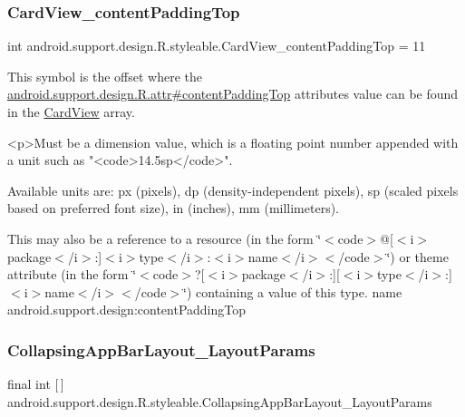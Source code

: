 \subsubsection{\texorpdfstring{Card\+View\+\_\+content\+Padding\+Top}{CardView\_contentPaddingTop}}
{\footnotesize\ttfamily int android.\+support.\+design.\+R.\+styleable.\+Card\+View\+\_\+content\+Padding\+Top = 11\hspace{0.3cm}{\ttfamily [static]}}

This symbol is the offset where the \hyperlink{classandroid_1_1support_1_1design_1_1R_1_1attr_aeca630891923da57bf05c2ea8d211897}{android.\+support.\+design.\+R.\+attr\#content\+Padding\+Top} attribute\textquotesingle{}s value can be found in the \hyperlink{classandroid_1_1support_1_1design_1_1R_1_1styleable_a56025691fb136d28dc5fce5a25d7c65e}{Card\+View} array.

\begin{DoxyVerb}      <p>Must be a dimension value, which is a floating point number appended with a unit such as "<code>14.5sp</code>".
\end{DoxyVerb}
 Available units are\+: px (pixels), dp (density-\/independent pixels), sp (scaled pixels based on preferred font size), in (inches), mm (millimeters). 

This may also be a reference to a resource (in the form \char`\"{}$<$code$>$@\mbox{[}$<$i$>$package$<$/i$>$\+:\mbox{]}$<$i$>$type$<$/i$>$\+:$<$i$>$name$<$/i$>$$<$/code$>$\char`\"{}) or theme attribute (in the form \char`\"{}$<$code$>$?\mbox{[}$<$i$>$package$<$/i$>$\+:\mbox{]}\mbox{[}$<$i$>$type$<$/i$>$\+:\mbox{]}$<$i$>$name$<$/i$>$$<$/code$>$\char`\"{}) containing a value of this type.  name android.\+support.\+design\+:content\+Padding\+Top \mbox{\label{classandroid_1_1support_1_1design_1_1R_1_1styleable_a84348eab6e616d953feaef19d531ee2f}} 
\subsubsection{\texorpdfstring{Collapsing\+App\+Bar\+Layout\+\_\+\+Layout\+Params}{CollapsingAppBarLayout\_LayoutParams}}
{\footnotesize\ttfamily final int \mbox{[}$\,$\mbox{]} android.\+support.\+design.\+R.\+styleable.\+Collapsing\+App\+Bar\+Layout\+\_\+\+Layout\+Params\hspace{0.3cm}{\ttfamily [static]}}

